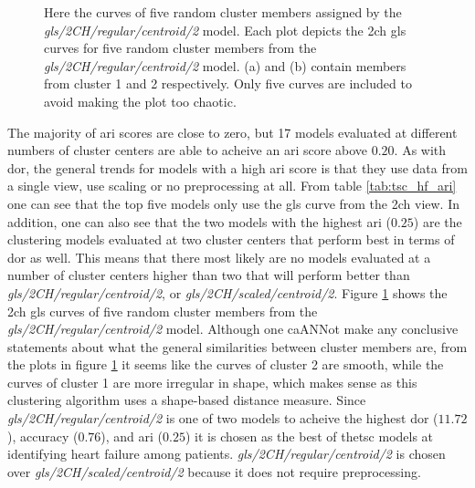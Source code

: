 \begin{figure}[htb]
    \centering
    
    \caption{Here the curves of five random cluster members assigned by the \textit{gls/2CH/regular/centroid/2} model.
             Each plot depicts the \acrshort{2ch} \acrshort{gls} curves for five random cluster members from the \textit{gls/2CH/regular/centroid/2} model. 
             (a) and (b) contain members from cluster 1 and 2 respectively. Only five curves are included to avoid making the plot too chaotic.}
    \label{fig:tsc_hf_best_meth_5_samples}
\end{figure}

\newpage

The majority of \acrshort{ari} scores are close to zero, but 17 models evaluated at different numbers of cluster centers are able to acheive an \acrshort{ari} score above $0.20$. As with \acrshort{dor}, the general trends for models with a high \acrshort{ari} score is that they use data from a single view, use scaling or no preprocessing at all. From table \ref{tab:tsc_hf_ari} one can see that the top five models only use the \acrshort{gls} curve from the \acrshort{2ch} view. In addition, one can also see that the two models with the highest \acrshort{ari} ($0.25$) are the clustering models evaluated at two cluster centers that perform best in terms of \acrshort{dor} as well. This means that there most likely are no models evaluated at a number of cluster centers higher than two that will perform better than \textit{gls/2CH/regular/centroid/2}, or \textit{gls/2CH/scaled/centroid/2}. Figure \ref{fig:tsc_hf_best_meth_5_samples} shows the \acrshort{2ch} \acrshort{gls} curves of five random cluster members from the \textit{gls/2CH/regular/centroid/2} model. Although one caANNot make any conclusive statements about what the general similarities between cluster members are, from the plots in figure \ref{fig:tsc_hf_best_meth_5_samples} it seems like the curves of cluster 2 are smooth, while the curves of cluster 1 are more irregular in shape, which makes sense as this clustering algorithm uses a shape-based distance measure. Since \textit{gls/2CH/regular/centroid/2} is one of two models to acheive the highest \acrshort{dor} ($11.72$), accuracy ($0.76$), and \acrshort{ari} ($0.25$) it is chosen as the best of the\acrshort{tsc} models at identifying heart failure among patients. \textit{gls/2CH/regular/centroid/2} is chosen over \textit{gls/2CH/scaled/centroid/2} because it does not require preprocessing.
\bigskip

